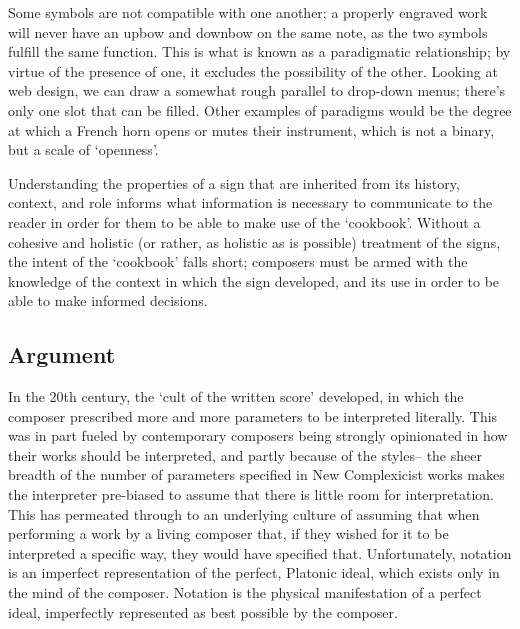 Some symbols are not compatible with one another; a properly engraved work will never have an upbow and downbow on the same note, as the two symbols fulfill the same function.
This is what is known as a paradigmatic relationship; by virtue of the presence of one, it excludes the possibility of the other.
Looking at web design, we can draw a somewhat rough parallel to drop-down menus; there's only one slot that can be filled.
Other examples of paradigms would be the degree at which a French horn opens or mutes their instrument, which is not a binary, but a scale of `openness'.

Understanding the properties of a sign that are inherited from its history, context, and role informs what information is necessary to communicate to the reader in order for them to be able to make use of the `cookbook'.
Without a cohesive and holistic (or rather, as holistic as is possible) treatment of the signs, the intent of the `cookbook' falls short; composers must be armed with the knowledge of the context in which the sign developed, and its use in order to be able to make informed decisions.

\subsection{Argument}
In the 20th century, the `cult of the written score' developed, in which the composer prescribed more and more parameters to be interpreted literally.\autocite[]{citation very much needed}
This was in part fueled by contemporary composers being strongly opinionated in how their works should be interpreted, and partly because of the styles-- the sheer breadth of the number of parameters specified in New Complexicist works makes the interpreter pre-biased to assume that there is little room for interpretation.
This has permeated through to an underlying culture of assuming that when performing a work by a living composer that, if they wished for it to be interpreted a specific way, they would have specified that.
Unfortunately, notation is an imperfect representation of the perfect, Platonic ideal, which exists only in the mind of the composer. 
Notation is the physical manifestation of a perfect ideal, imperfectly represented as best possible by the composer.

